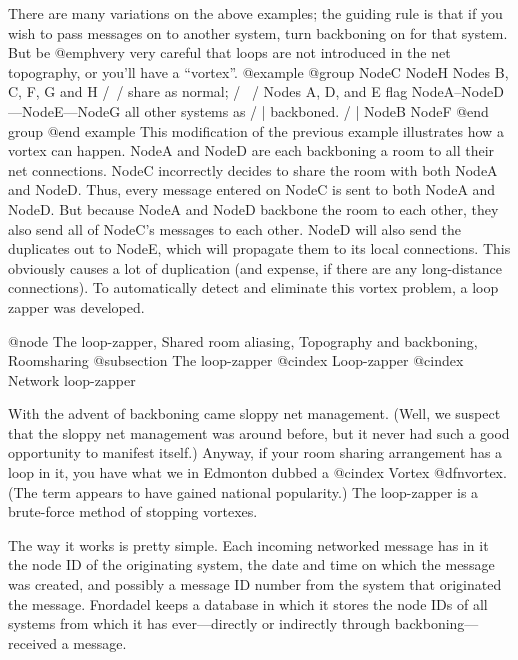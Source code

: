 There are many variations on the above examples; the
guiding rule is that if you wish to pass messages on to another
system, turn backboning on for that system.  But be @emph{very very}
careful that loops are not introduced in the net topography, or
you'll have a ``vortex''.
@example
@group
        NodeC         NodeH          Nodes B, C, F, G and H
         /\            /             share as normal;
        /  \          /              Nodes A, D, and E flag
    NodeA--NodeD---NodeE---NodeG     all other systems as
     /       |                       backboned.
    /        |                       
  NodeB    NodeF                    
@end group
@end example
This modification of the previous example illustrates how a vortex can
happen.  NodeA and NodeD are each backboning a room to all their net
connections.  NodeC incorrectly decides to share the room with both
NodeA and NodeD.  Thus, every message entered on NodeC is sent to both
NodeA and NodeD.  But because NodeA and NodeD backbone the room to
each other, they also send all of NodeC's messages to each other.  NodeD
will also send the duplicates out to NodeE, which will propagate them to
its local connections.  This obviously causes a lot of duplication (and
expense, if there are any long-distance connections).  To automatically
detect and eliminate this vortex problem, a loop zapper was developed.

@node The loop-zapper, Shared room aliasing, Topography and backboning, Roomsharing
@subsection The loop-zapper
@cindex Loop-zapper
@cindex Network loop-zapper

With the advent of backboning came sloppy net management.
(Well, we suspect that the sloppy net management was around before,
but it never had such a good opportunity to manifest itself.)
Anyway, if your room sharing arrangement has a loop in it,
you have what we in Edmonton dubbed a
@cindex Vortex
@dfn{vortex}.  (The term appears
to have gained national popularity.)  The loop-zapper is a brute-force
method of stopping vortexes.

The way it works is pretty simple.  Each incoming networked
message has in it the node ID of the originating system, the
date and time on which the message was created, and possibly a message ID
number from the system that originated the message.  Fnordadel keeps a
database in which it stores the node IDs of all systems from which
it has ever---directly or indirectly through backboning---received
a message.

